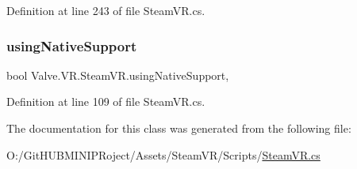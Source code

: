Definition at line 243 of file Steam\+V\+R.\+cs.

\mbox{\label{class_valve_1_1_v_r_1_1_steam_v_r_ae5409008a8d99e33625353d01cb3461a}} 
\subsubsection{\texorpdfstring{usingNativeSupport}{usingNativeSupport}}
{\footnotesize\ttfamily bool Valve.\+V\+R.\+Steam\+V\+R.\+using\+Native\+Support\hspace{0.3cm}{\ttfamily [static]}, {\ttfamily [get]}}



Definition at line 109 of file Steam\+V\+R.\+cs.



The documentation for this class was generated from the following file\+:\begin{DoxyCompactItemize}
\item 
O\+:/\+Git\+H\+U\+B\+M\+I\+N\+I\+P\+Roject/\+Assets/\+Steam\+V\+R/\+Scripts/\mbox{\hyperlink{_steam_v_r_8cs}{Steam\+V\+R.\+cs}}\end{DoxyCompactItemize}
